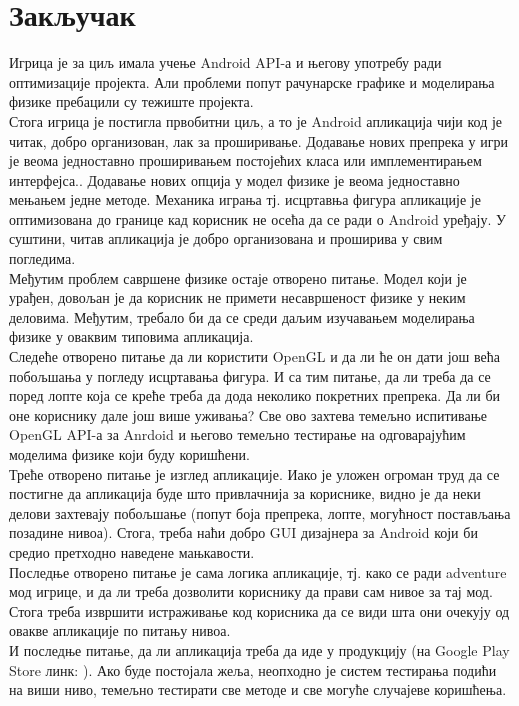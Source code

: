 \chapter{Закључак} \label{Conclusion}

Игрица је за циљ имала учење Android API-а и његову употребу ради оптимизације пројекта. Али проблеми попут рачунарске графике и моделирања физике пребацили су тежиште пројекта.  
\\ \indent Стога игрица је постигла првобитни циљ, а то је Android апликација чији код је читак, добро организован, лак за проширивање. Додавање нових препрека у игри је веома једноставно проширивањем постојећих класа или имплементирањем интерфејса.. Додавање нових опција у модел физике је веома једноставно мењањем једне методе. Механика играња тј. исцртавња фигура апликације је оптимизована до границе кад корисник не осећа да се ради о Android уређају. У суштини, читав апликација је добро организована и проширива у свим погледима. 
\\ \indent Међутим проблем савршене физике остаје отворено питање. Модел који је урађен, довољан је да корисник не примети несавршеност физике у неким деловима. Међутим, требало би да се среди даљим изучавањем моделирања физике у оваквим типовима апликација. 
\\ \indent Следеће отворено питање да ли користити OpenGL и да ли ће он дати још већа побољшања у погледу исцртавања фигура. И са тим питање, да ли треба да се поред лопте која се креће треба да дода неколико покретних препрека. Да ли би оне кориснику дале још више уживања? Све ово захтева темељно испитивање OpenGL API-а за Anrdoid и његово темељно тестирање на одговарајућим моделима физике који буду коришћени.
\\ \indent Треће отворено питање је изглед апликације. Иако је уложен огроман  труд да се постигне да апликација буде што привлачнија за кориснике, видно је да неки делови захтевају побољшање (попут боја препрека, лопте, могућност постављања позадине нивоа).  Стога, треба наћи добро GUI дизајнера за Android који би средио претходно наведене мањкавости. 
\\ \indent Последње отворено питање је сама логика апликације, тј. како се ради adventure мод игрице, и да ли треба дозволити кориснику да прави сам нивое за тај мод. Стога треба извршити истраживање код корисника да се види шта они очекују од овакве апликације по питању нивоа.
\\ \indent И последње питање, да ли апликација треба да иде у продукцију (на Google Play Store линк: \cite{GooglePlayStore}). Ако буде постојала жеља, неопходно је систем тестирања подићи на виши ниво, темељно тестирати све методе и све могуће случајеве коришћења. 
